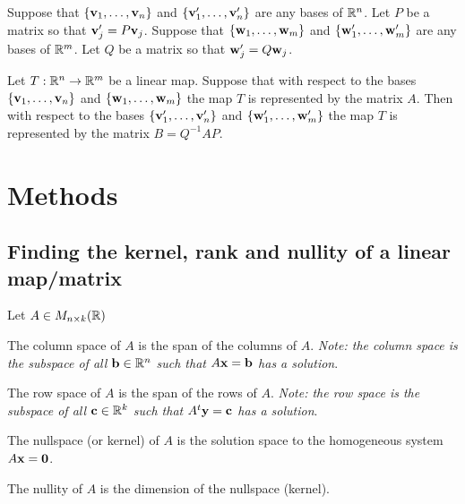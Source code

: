 \documentclass[10pt, a4paper]{article}
\begin{document}
\begin{corollary}
    Suppose that $\{\mathbf{v}_1, \dotsc, \mathbf{v}_n\}$ and $\{\mathbf{v}'_1, \dotsc, \mathbf{v}'_n\}$ are any bases of $\mathbb{R} ^ n$.
    Let $P$ be a matrix so that $\mathbf{v}'_j = P\mathbf{v}_j$.
    Suppose that $\{\mathbf{w}_1, \dotsc, \mathbf{w}_m\}$ and $\{\mathbf{w}'_1, \dotsc, \mathbf{w}'_m\}$ are any bases of $\mathbb{R} ^ m$.
    Let $Q$ be a matrix so that $\mathbf{w}'_j = Q\mathbf{w}_j$.

    Let $T : \mathbb{R} ^ n \rightarrow \mathbb{R} ^ m$ be a linear map.
    Suppose that with respect to the bases $\{\mathbf{v}_1, \dotsc, \mathbf{v}_n\}$ and $\{\mathbf{w}_1, \dotsc, \mathbf{w}_m\}$ the map $T$ is represented by the matrix $A$.
    Then with respect to the bases $\{\mathbf{v}'_1, \dotsc, \mathbf{v}'_n\}$ and $\{\mathbf{w}'_1, \dotsc, \mathbf{w}'_m\}$ the map $T$ is represented by the matrix $B = Q ^ {-1}AP$.
\end{corollary}

\newpage

\section{Methods}

\subsection{Finding the kernel,
rank and nullity of a linear map/matrix}

Let $A \in M_{n \times k}(\mathbb{R})$
\begin{definition}
    The column space of $A$ is the span of the columns of $A$.
    \textit{Note:
    the column space is the subspace of all $\mathbf{b} \in \mathbb{R} ^ n$ such that $A\mathbf{x} = \mathbf{b}$ has a solution}.
\end{definition}

\begin{definition}
    The row space of $A$ is the span of the rows of $A$.
    \textit{Note:
    the row space is the subspace of all $\mathbf{c} \in \mathbb{R} ^ k$ such that $A ^ t\mathbf{y} = \mathbf{c}$ has a solution}.
\end{definition}

\begin{definition}[Nullspace]
    The nullspace
    (or kernel)
    of $A$ is the solution space to the homogeneous system $A\mathbf{x} = \mathbf{0}$.
\end{definition}

\begin{definition}[Nullity]
    The nullity of $A$ is the dimension of the nullspace
    (kernel).
\end{definition}
\end{document}
